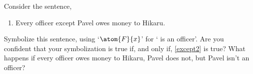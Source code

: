 
\problempart Consider the sentence,
\begin{enumerate}[start=19,ref=\arabic*]
	\item\label{except2} Every officer except Pavel owes money to Hikaru.
\end{enumerate}
Symbolize this sentence, using `$\atom{F}{x}$' for ` is an officer'.  Are you confident that your symbolization is true if, and only if, \cref*{except2} is true?  What happens if every officer owes money to Hikaru, Pavel does not, but Pavel isn't an officer? 

